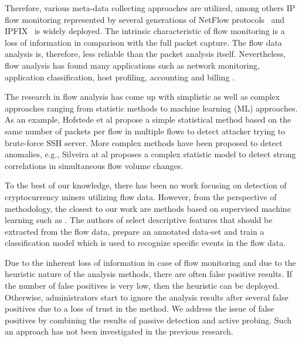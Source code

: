 \documentclass[preprint,12pt,3p]{elsarticle}
\begin{document}
 
Therefore, various meta-data collecting approaches are utilized, among others IP flow monitoring represented by several generations of NetFlow protocols~\cite{RFC3954} and IPFIX~\cite{RFC7011} is widely deployed. The intrinsic characteristic of flow monitoring is a loss of information in comparison with the full packet capture. The flow data analysis is, therefore, less reliable than the packet analysis itself. Nevertheless, flow analysis has found many applications such as network monitoring, application classification, host profiling, accounting and billing \cite{flowapplicationsurvey}.

The research in flow analysis has come up with simplistic as well as complex approaches ranging from statistic methods to machine learning (ML) approaches. As an example, Hofstede et al \cite{sshcompromise} propose a simple statistical method based on the same number of packets per flow in multiple flows to detect attacker trying to brute-force SSH server. More complex methods have been proposed to detect anomalies, e.g., Silveira at al \cite{astute} proposes a complex statistic model to detect strong correlations in simultaneous flow volume changes.

To the best of our knowledge, there has been no work focusing on detection of cryptocurrency miners utilizing flow data.
However, from the perspective of methodology, the closest to our work are methods based on supervised machine learning such as \cite{mlflow}. The authors of \cite{mlflow} select descriptive features that should be extracted from the flow data, prepare an annotated data-set and train a classification model which is used to recognize specific events in the flow data. 

Due to the inherent loss of information in case of flow monitoring and due to the heuristic nature of the analysis methods, there are often false positive results. If the number of false positives is very low, then the heuristic can be deployed. Otherwise, administrators start to ignore the analysis results after several false positives due to a loss of trust in the method.
We address the issue of false positives by combining the results of passive detection and active probing. Such an approach has not been investigated in the previous research.
\end{document}
